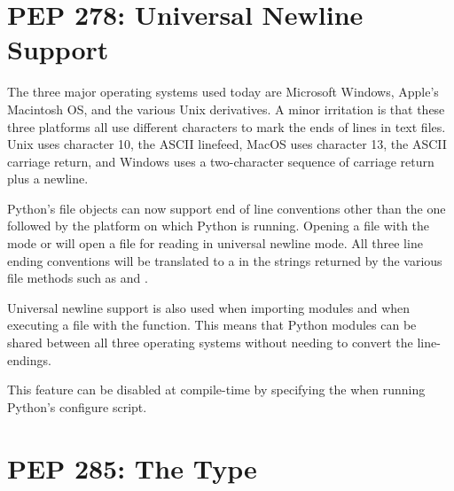 \documentclass{howto}
\begin{document}
\begin{seealso}


\end{seealso}


\section{PEP 278: Universal Newline Support}

The three major operating systems used today are Microsoft Windows,
Apple's Macintosh OS, and the various Unix derivatives.  A minor
irritation is that these three platforms all use different characters
to mark the ends of lines in text files.  Unix uses character 10, the
ASCII linefeed, MacOS uses character 13, the ASCII carriage return,
and Windows uses a two-character sequence of carriage return plus a
newline.

Python's file objects can now support end of line conventions other
than the one followed by the platform on which Python is running.
Opening a file with the mode  or  will open a file
for reading in universal newline mode.  All three line ending
conventions will be translated to a  in the strings
returned by the various file methods such as  and
. 

Universal newline support is also used when importing modules and when
executing a file with the  function.  This means
that Python modules can be shared between all three operating systems
without needing to convert the line-endings.

This feature can be disabled at compile-time by specifying the
 when running Python's
configure script.

\begin{seealso}


\end{seealso}

\section{PEP 285: The  Type}
\label{section-bool}
\end{document}
